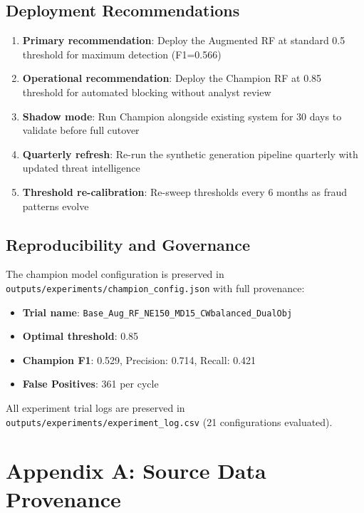 \documentclass[12pt,a4paper,oneside]{book}
\begin{document}
\section{Deployment Recommendations}

\begin{enumerate}
    \item \textbf{Primary recommendation}: Deploy the Augmented RF at standard 0.5 threshold for maximum detection (F1=0.566)
    \item \textbf{Operational recommendation}: Deploy the Champion RF at 0.85 threshold for automated blocking without analyst review
    \item \textbf{Shadow mode}: Run Champion alongside existing system for 30 days to validate before full cutover
    \item \textbf{Quarterly refresh}: Re-run the synthetic generation pipeline quarterly with updated threat intelligence
    \item \textbf{Threshold re-calibration}: Re-sweep thresholds every 6 months as fraud patterns evolve
\end{enumerate}

\section{Reproducibility and Governance}

The champion model configuration is preserved in \texttt{outputs/experiments/champion\_config.json} with full provenance:

\begin{itemize}
    \item \textbf{Trial name}: \texttt{Base\_Aug\_RF\_NE150\_MD15\_CWbalanced\_DualObj}
    \item \textbf{Optimal threshold}: 0.85
    \item \textbf{Champion F1}: 0.529, Precision: 0.714, Recall: 0.421
    \item \textbf{False Positives}: 361 per cycle
\end{itemize}

All experiment trial logs are preserved in \texttt{outputs/experiments/experiment\_log.csv} (21 configurations evaluated).

\clearpage

\appendix
\chapter{Appendix A: Source Data Provenance}
\end{document}
